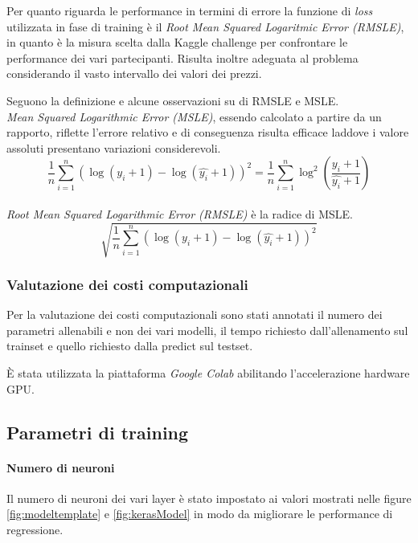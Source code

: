 Per quanto riguarda le performance in termini di errore la funzione di
\textit{loss} utilizzata in fase di training è il \textit{Root Mean Squared
Logaritmic Error (RMSLE)}, in quanto è la misura scelta dalla Kaggle challenge
per confrontare le performance dei vari partecipanti. Risulta inoltre
adeguata al problema considerando il vasto intervallo dei valori dei prezzi.

Seguono la definizione e alcune osservazioni su di RMSLE e MSLE.
\\
\textit{Mean Squared Logarithmic Error (MSLE)}, essendo calcolato a partire
da un rapporto, riflette l'errore relativo e di conseguenza risulta efficace
laddove i valore assoluti presentano variazioni considerevoli.
\begin{equation}
    \frac{1}{n}
        \sum_{i=1}^{n}
            ( \log(y_i+1) - \log(\hat{y_i}+1) )^2
    =
    \frac{1}{n}
        \sum_{i=1}^{n}
            \log^2(\frac{y_i+1}{\hat{y_i}+1})
\end{equation}
\\
\textit{Root Mean Squared Logarithmic Error (RMSLE)} è la radice di MSLE.
\begin{equation}
    \sqrt{ 
        \frac{1}{n}
            \sum_{i=1}^{n}
                ( \log(y_i+1) - \log(\hat{y_i}+1) )^2
    }
\end{equation}



\subsubsection{Valutazione dei costi computazionali}

Per la valutazione dei costi computazionali sono stati annotati il numero dei
parametri allenabili e non dei vari modelli, il tempo richiesto dall'allenamento
sul trainset e quello richiesto dalla predict sul testset.

È stata utilizzata la piattaforma \textit{Google Colab} abilitando l'accelerazione hardware GPU.


\subsection{Parametri di training}

\paragraph{Numero di neuroni} Il numero di neuroni dei vari layer è stato
impostato ai valori mostrati nelle figure \ref{fig:modeltemplate} e
\ref{fig:kerasModel} in modo da migliorare le performance di regressione.

